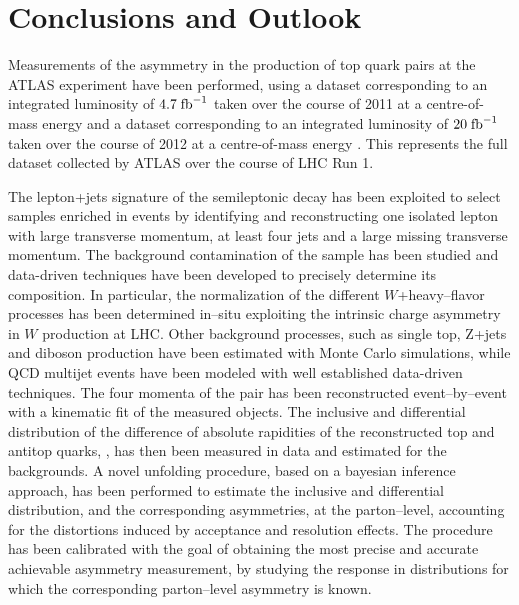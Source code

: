 \chapter{Conclusions and Outlook}
\label{sec:conclusion}

Measurements of the asymmetry in the production of top quark pairs at
the ATLAS experiment have been performed, using a dataset
corresponding to an integrated luminosity of $4.7 \; \mathrm{fb}^{-1}{}$ taken over
the course of 2011 at a centre-of-mass energy \seventev{} and a
dataset corresponding to an integrated luminosity of $20 \; \mathrm{fb}^{-1}{}$
taken over the course of 2012 at a centre-of-mass energy \eighttev{}.
This represents the full dataset collected by ATLAS over the course of
LHC Run 1.

The lepton+jets signature of the semileptonic \ttbar{} decay has been
exploited to select samples enriched in \ttbar{} events by identifying
and reconstructing one isolated lepton with large transverse momentum,
at least four jets and a large missing transverse momentum.
The background contamination of the sample has been studied and
data-driven techniques have been developed to precisely determine its
composition. In particular, the normalization of the different
$W$+heavy--flavor processes has been determined in--situ exploiting
the intrinsic charge asymmetry in $W$ production at LHC. 
Other background processes, such
as single top, Z+jets and diboson production have been estimated with
Monte Carlo simulations, while QCD multijet events have been modeled
with well established data-driven techniques.
The four momenta of the \ttbar{} pair has been reconstructed
event--by--event with a kinematic fit of the measured objects. The
inclusive and differential distribution of the difference of absolute
rapidities of the reconstructed top and antitop quarks, \dy{}, has then been
measured in data and estimated for the backgrounds.
A novel unfolding procedure, based on a bayesian inference approach, has
been performed to estimate the inclusive and differential \dy{}
distribution, and the corresponding asymmetries, at the parton--level,
accounting for the distortions induced by acceptance and
resolution effects.
The procedure has been calibrated with the goal of obtaining the most
precise and accurate achievable asymmetry measurement, by studying the
response in distributions for which the corresponding parton--level
asymmetry is known.

